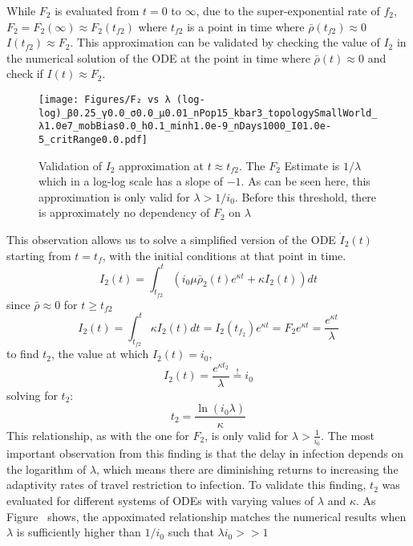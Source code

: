 While $F_2$ is evaluated from $t=0$ to $\infty$, due to the super-exponential rate of $f_2$, $F_2=F_2(\infty)\approx F_2(t_{f2})$ where $t_{f2}$ is a point in time where $\bar\rho(t_{f2})\approx 0$  $I({t_{f2}})\approx F_2$. This approximation can be validated by checking the value of $I_2$ in the numerical solution of the ODE at the point in time where $\bar\rho(t)\approx 0$ and check if $I(t)\approx F_2$. 

\begin{figure}[!ht]
    \centering
    \texttt{[image: Figures/F₂ vs λ (log-log)\_β0.25\_γ0.0\_σ0.0\_μ0.01\_nPop15\_kbar3\_topologySmallWorld\_λ1.0e7\_mobBias0.0\_h0.1\_minh1.0e-9\_nDays1000\_I01.0e-5\_critRange0.0.pdf]}
    \caption{\small Validation of $I_2$ approximation at $t \approx t_{f2}$. The $F_2$ Estimate is $1/\lambda$ which in a log-log scale has a slope of $-1$. As can be seen here, this approximation is only valid for $\lambda>1/i_0$. Before this threshold, there is approximately no dependency of $F_2$ on $\lambda$ }

\end{figure}

This observation allows us to solve a simplified version of the ODE $\dot I_2(t)$ starting from $t=t_f$, with the initial conditions at that point in time.
\begin{equation} I_2(t) = \int_{t_{f2}}^t \left(i_{0} \mu \bar \rho_{2}{(t)} e^{\kappa t} + \kappa I_{2}{\left(t \right)}\right) dt\end{equation}
since $\bar \rho \approx 0$ for $t\ge t_{f2}$ 
\begin{equation}I_2(t) = \int_{t_{f2}}^t  \kappa I_{2}{\left(t \right)} dt = I_2(t_{f_2})e^{\kappa t} = F_2 e^{\kappa t} =\frac{e^{\kappa t}}{\lambda}\end{equation}
to find $t_2$, the value at which $I_2(t)=i_0$, 
\begin{equation}I_2(t) =\frac{e^{\kappa t_2}}{\lambda}\stackrel{!}{=} i_0\end{equation}
solving for $t_2$:
\begin{equation}t_2=\frac{\ln(i_0 \lambda)}{\kappa}\end{equation}
This relationship, as with the one for $F_2$, is only valid for $\lambda> \frac{1}{i_0}$. The most important observation from this finding is that the delay in infection depends on the logarithm of $\lambda$, which means there are diminishing returns to increasing the adaptivity rates of travel restriction to infection. To validate this finding, $t_2$ was evaluated for different systems of ODEs with varying values of $\lambda$ and $\kappa$. As Figure~%
shows, the appoximated relationship matches the numerical results when $\lambda$ is sufficiently higher than $1/i_0$ such that $\lambda i_0 >>1$ 

